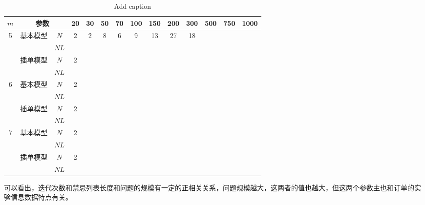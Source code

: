 \begin{table}[htbp]
  \centering
  \caption{Add caption}
    \begin{tabular}{cccccccccccccc}
    \toprule
    $m $    & \multicolumn{2}{c}{参数} & 20    & 30    & 50    & 70    & 100   & 150   & 200   & 300   & 500   & 750   & 1000 \\
    \midrule
    \multirow{4}[0]{*}{5} & \multirow{2}[0]{*}{基本模型} & $N$    & 2     & 2     & 8     & 6     & 9     & 13    & 27    & 18    &       &       &  \\
          &       & $NL$    &       &       &       &       &       &       &       &       &       &       &  \\
          & \multirow{2}[0]{*}{插单模型} & $N$    & 2     &       &       &       &       &       &       &       &       &       &  \\
          &       & $NL$    &       &       &       &       &       &       &       &       &       &       &  \\
    \multirow{4}[0]{*}{6} & \multirow{2}[0]{*}{基本模型} & $N$    & 2     &       &       &       &       &       &       &       &       &       &  \\
          &       & $NL$    &       &       &       &       &       &       &       &       &       &       &  \\
          & \multirow{2}[0]{*}{插单模型} & $N$    & 2     &       &       &       &       &       &       &       &       &       &  \\
          &       & $NL$    &       &       &       &       &       &       &       &       &       &       &  \\
    \multirow{4}[0]{*}{7} & \multirow{2}[0]{*}{基本模型} & $N$    & 2     &       &       &       &       &       &       &       &       &       &  \\
          &       & $NL$    &       &       &       &       &       &       &       &       &       &       &  \\
          & \multirow{2}[0]{*}{插单模型} & $N$    & 2     &       &       &       &       &       &       &       &       &       &  \\
          &       & $NL$    &       &       &       &       &       &       &       &       &       &       &  \\
    \bottomrule
    \end{tabular}%
  \label{tab:addlabel}%
\end{table}%
可以看出，迭代次数和禁忌列表长度和问题的规模有一定的正相关关系，问题规模越大，这两者的值也越大，但这两个参数主也和订单的实验信息数据特点有关。
 
